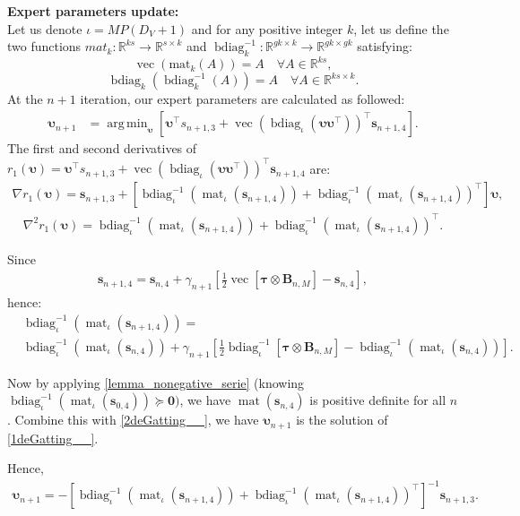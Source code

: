 \documentclass{article}
\newcommand{\zero}{\ensuremath{\mathbf{0}}}
\DeclareMathOperator*{\vect}{vec} %
\DeclareMathOperator*{\mat}{mat}
\DeclareMathOperator{\bdiag}{bdiag}
\def\taub        {{\sbmm{\tau}}\XS}
\def\XS{\xspace}
\def\sbmm#1{\ensuremath{\boldsymbol{#1}}}
\def\vupsilon{{\bm{\upsilon}}}
\def\vs{{\bm{s}}}
\def\mB{{\bm{B}}}
\def\sR{{\mathbb{R}}}
\DeclareMathOperator*{\argmin}{arg\,min}
\begin{document}
\textbf{Expert parameters update:}\\
Let us denote $\iota=MP(D_V+1)$ and for any positive integer $k$, let us define the two functions $mat_k:\sR^{ks}\rightarrow \sR^{s\times k}$ and ${\bdiag}_k^{-1}:\sR^{gk \times k}\rightarrow \sR^{gk\times gk}$ satisfying:
$$\vect(\mathrm{mat}_{k}(A))=A\quad \forall A\in \sR^{ks},$$
$${\bdiag}_k({\bdiag}_k^{-1}(A))=A\quad \forall A\in \sR^{ks\times k}.$$
At the $n+1$ iteration, our expert parameters are calculated as followed:
\begin{align*}
    \vupsilon_{n+1}&=\displaystyle\argmin_{\vupsilon}\left[\vupsilon^{\top}s_{n+1,3}+\vect\left({\bdiag}_{\iota}(\vupsilon\vupsilon^{\top})\right)^{\top}\vs_{n+1,4}\right].
\end{align*}
The first and second derivatives of $r_1(\vupsilon)=\vupsilon^{\top}s_{n+1,3}+\vect\left({\bdiag}_{\iota}(\vupsilon\vupsilon^{\top})\right)^{\top}\vs_{n+1,4}$ are:
\begin{align} \label{1deGatting__}
   \nabla r_1(\vupsilon)=\vs_{n+1,3}+\left[{\bdiag}_{\iota}^{-1}({\mat}_{\iota}(\vs_{n+1,4}))+{\bdiag}_{\iota}^{-1}({\mat}_{\iota}(\vs_{n+1,4}))^{\top}\right]\vupsilon,
\end{align}
\begin{align} \label{2deGatting__}
   \nabla^2 r_1(\vupsilon)={\bdiag}_{\iota}^{-1}({\mat}_{\iota}(\vs_{n+1,4}))+{\bdiag}_{\iota}^{-1}({\mat}_{\iota}(\vs_{n+1,4}))^{\top}.
\end{align}
\par Since
\begin{align*}
    \vs_{n+1,4}=\vs_{n,4}+\gamma_{n+1}\left[\frac{1}{2}\vect\left[\taub\otimes\mB_{n,M}\right]-\vs_{n,4}\right],
\end{align*}
hence:
\begin{align*}
    &{\bdiag}_{\iota}^{-1}({\mat}_{\iota}(\vs_{n+1,4}))=\\
    &{\bdiag}_{\iota}^{-1}({\mat}_{\iota}(\vs_{n,4}))+\gamma_{n+1}\left[\frac{1}{2}{\bdiag}_{\iota}^{-1}\left[\taub\otimes\mB_{n,M}\right]-{\bdiag}_{\iota}^{-1}({\mat}_{\iota}(\vs_{n,4}))\right].
\end{align*}
\par Now by applying \cref{lemma_nonegative_serie} (knowing ${\bdiag}_{\iota}^{-1}({\mat}_{\iota}(\vs_{0,4}))\succeq \zero)$, we have $\mat(\vs_{n,4})$ is positive definite for all $n$. Combine this with \cref{2deGatting__}, we have $\vupsilon_{n+1}$ is the solution of \cref{1deGatting__}.

Hence,
\begin{align*}
\vupsilon_{n+1} = -\left[{\bdiag}_{\iota}^{-1}({\mat}_{\iota}(\vs_{n+1,4}))+{\bdiag}_{\iota}^{-1}({\mat}_{\iota}(\vs_{n+1,4}))^{\top}\right]^{-1} \vs_{n+1,3}.
\end{align*}
\end{document}
